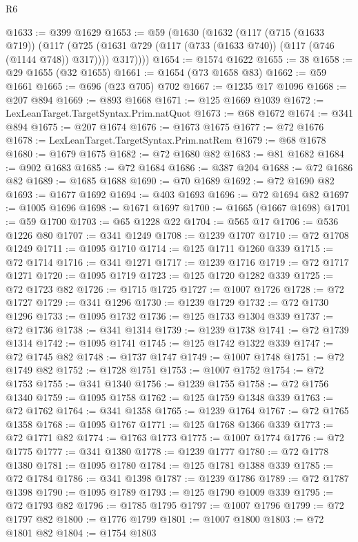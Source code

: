 \begin{lexlean}{R6}
\begin{coremodule}
@1633 := @399 @1629
@1653 := @59
    (@1630
      (@1632
        (@117
          (@715 (@1633 @719))
          (@117
            (@725 (@1631 @729 (@117 (@733 (@1633 @740)) (@117 (@746 (@1144 @748)) @317))))
            @317))))
@1654 := @1574 @1622
@1655 := 38
@1658 := @29 @1655 (@32 @1655)
@1661 := @1654 (@73 @1658 @83)
@1662 := @59 @1661
@1665 := @696 (@23 @705) @702
@1667 := @1235 @17 @1096
@1668 := @207 @894
@1669 := @893 @1668
@1671 := @125 @1669 @1039
@1672 := LexLeanTarget.TargetSyntax.Prim.natQuot
@1673 := @68 @1672
@1674 := @341 @894
@1675 := @207 @1674
@1676 := @1673 @1675
@1677 := @72 @1676
@1678 := LexLeanTarget.TargetSyntax.Prim.natRem
@1679 := @68 @1678
@1680 := @1679 @1675
@1682 := @72 @1680 @82
@1683 := @81 @1682
@1684 := @902 @1683
@1685 := @72 @1684
@1686 := @387 @204
@1688 := @72 @1686 @82
@1689 := @1685 @1688
@1690 := @70 @1689
@1692 := @72 @1690 @82
@1693 := @1677 @1692
@1694 := @403 @1693
@1696 := @72 @1694 @82
@1697 := @1005 @1696
@1698 := @1671 @1697
@1700 := @1665 (@1667 @1698)
@1701 := @59 @1700
@1703 := @65 @1228 @22
@1704 := @565 @17
@1706 := @536 @1226 @80
@1707 := @341 @1249
@1708 := @1239 @1707
@1710 := @72 @1708 @1249
@1711 := @1095 @1710
@1714 := @125 @1711 @1260 @339
@1715 := @72 @1714
@1716 := @341 @1271
@1717 := @1239 @1716
@1719 := @72 @1717 @1271
@1720 := @1095 @1719
@1723 := @125 @1720 @1282 @339
@1725 := @72 @1723 @82
@1726 := @1715 @1725
@1727 := @1007 @1726
@1728 := @72 @1727
@1729 := @341 @1296
@1730 := @1239 @1729
@1732 := @72 @1730 @1296
@1733 := @1095 @1732
@1736 := @125 @1733 @1304 @339
@1737 := @72 @1736
@1738 := @341 @1314
@1739 := @1239 @1738
@1741 := @72 @1739 @1314
@1742 := @1095 @1741
@1745 := @125 @1742 @1322 @339
@1747 := @72 @1745 @82
@1748 := @1737 @1747
@1749 := @1007 @1748
@1751 := @72 @1749 @82
@1752 := @1728 @1751
@1753 := @1007 @1752
@1754 := @72 @1753
@1755 := @341 @1340
@1756 := @1239 @1755
@1758 := @72 @1756 @1340
@1759 := @1095 @1758
@1762 := @125 @1759 @1348 @339
@1763 := @72 @1762
@1764 := @341 @1358
@1765 := @1239 @1764
@1767 := @72 @1765 @1358
@1768 := @1095 @1767
@1771 := @125 @1768 @1366 @339
@1773 := @72 @1771 @82
@1774 := @1763 @1773
@1775 := @1007 @1774
@1776 := @72 @1775
@1777 := @341 @1380
@1778 := @1239 @1777
@1780 := @72 @1778 @1380
@1781 := @1095 @1780
@1784 := @125 @1781 @1388 @339
@1785 := @72 @1784
@1786 := @341 @1398
@1787 := @1239 @1786
@1789 := @72 @1787 @1398
@1790 := @1095 @1789
@1793 := @125 @1790 @1009 @339
@1795 := @72 @1793 @82
@1796 := @1785 @1795
@1797 := @1007 @1796
@1799 := @72 @1797 @82
@1800 := @1776 @1799
@1801 := @1007 @1800
@1803 := @72 @1801 @82
@1804 := @1754 @1803

\end{coremodule}
\end{lexlean}
